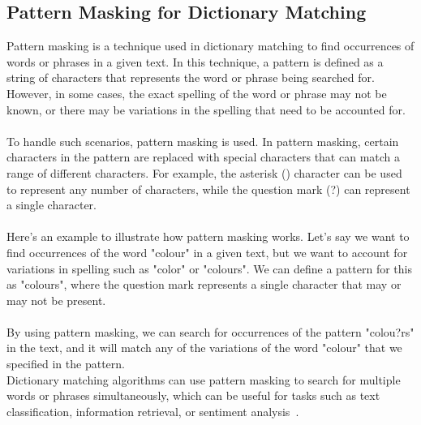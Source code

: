 \subsection{Pattern Masking for Dictionary Matching} \label{pmdm}
Pattern masking is a technique used in dictionary matching to find occurrences of words or phrases in a given text.
In this technique, a pattern  is defined as a string of characters that represents the word or phrase being searched for.
However, in some cases, the exact spelling of the word or phrase may not be known, or there may be variations in the
spelling that need to be accounted for.\\
\\
To handle such scenarios, pattern masking is used. In pattern masking, certain characters in the pattern are replaced
with special characters that can match a range of different characters. For example, the asterisk (\*) character can be
used to represent any number of characters, while the question mark (?) can represent a single character.\\
\\
Here's an example to illustrate how pattern masking works. Let's say we want to find occurrences of the word
"colour" in a given text, but we want to account for variations in spelling such as "color" or "colours".
We can define a pattern for this as "colours", where the question mark represents a single character that
may or may not be present.\\
\\
By using pattern masking, we can search for occurrences of the pattern "colou?rs" in the text, and it will match
any of the variations of the word "colour" that we specified in the pattern.\\
Dictionary matching algorithms can use pattern masking to search for multiple words or phrases simultaneously,
which can be useful for tasks such as text classification, information retrieval, or sentiment analysis~\cite{pmdm}.

